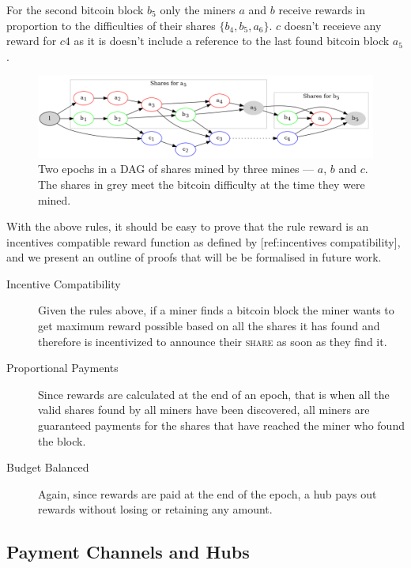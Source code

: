 \documentclass{article}
\begin{document}
For the second bitcoin block $b_5$ only the miners $a$ and $b$ receive
rewards in proportion to the difficulties of their shares $\{b_4, b_5,
a_6\}$. $c$ doesn't receieve any reward for $c4$ as it is doesn't
include a reference to the last found bitcoin block $a_5$.

\begin{figure}[h]
  \begin{center}
    \includegraphics[width=1.0\textwidth]{shares-dag}
    \caption{Two epochs in a DAG of shares mined by three mines ---
      $a$, $b$ and $c$. The shares in grey meet the bitcoin difficulty
      at the time they were mined.}\label{fig:shares-dag}
  \end{center}
\end{figure}

With the above rules, it should be easy to prove that the rule reward
is an incentives compatible reward function as defined by
[ref:incentives compatibility], and we present an outline of proofs
that will be be formalised in future work.

\begin{description}
  \item [Incentive Compatibility] Given the rules above, if a miner
    finds a bitcoin block the miner wants to get maximum reward
    possible based on all the shares it has found and therefore is
    incentivized to announce their \textsc{share} as soon as they find
    it.
  \item [Proportional Payments] Since rewards are calculated at the
    end of an epoch, that is when all the valid shares found by all
    miners have been discovered, all miners are guaranteed payments
    for the shares that have reached the miner who found the block.
  \item [Budget Balanced] Again, since rewards are paid at the end of
    the epoch, a hub pays out rewards without losing or retaining any
    amount.
\end{description}


\subsection{Payment Channels and Hubs}
\end{document}
